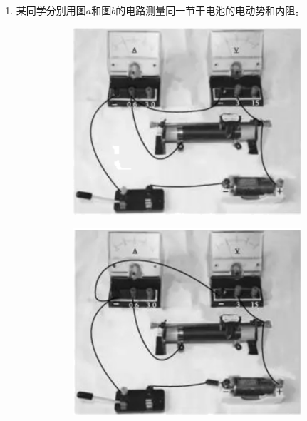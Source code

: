 \begin{enumerate}
\newpage
\item
某同学分别用图$ a $和图$ b $的电路测量同一节干电池的电动势和内阻。
\begin{figure}[h!]
\centering
\begin{subfigure}{0.4\linewidth}
\centering
\includegraphics[width=0.9\linewidth]{picture/screenshot050}
\caption{}\label{}
\end{subfigure}
\hfil
\begin{subfigure}{0.4\linewidth}
\centering
\includegraphics[width=0.9\linewidth]{picture/screenshot051}
\caption{}\label{}
\end{subfigure}
\end{figure}




\end{enumerate}
